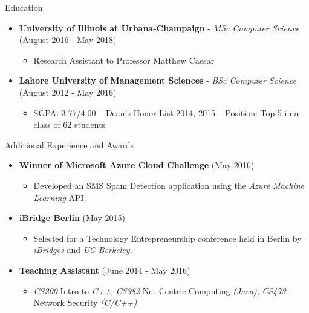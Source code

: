 \documentclass[]{Gohar_CV_Jobs}
\begin{document}
    \begin{cvsection}{Education}
        \begin{cvsubsection}{}{}{}
            \begin{itemize}
                \item \textbf{University of Illinois at Urbana-Champaign} - \textit{MSc Computer Science} \hfill(August 2016 - May 2018)
                    \begin{itemize}
                        \item Research Assistant to Professor Matthew Caesar 
                    \end{itemize}
                \item \textbf{Lahore University of Management Sciences} - \textit{BSc Computer Science} \hfill(August 2012 - May 2016)
                    \begin{itemize}
                        \item SGPA: 3.77/4.00 – Dean’s Honor List 2014, 2015 – Position: Top 5 in a class of 62 students
                    \end{itemize}
            \end{itemize}
        \end{cvsubsection}
    \end{cvsection}
    
    \begin{cvsection}{Additional Experience and Awards}
        \begin{cvsubsection}{}{}{}  
            \begin{itemize}
                \item \textbf{Winner of Microsoft Azure Cloud Challenge} \hfill(May 2016)
                    \begin{itemize}
                        \item Developed an SMS Spam Detection application using the \textit{Azure Machine Learning} API.
                    \end{itemize}
                \item \textbf{iBridge Berlin} \hfill(May 2015) 
                    \begin{itemize}
                        \item Selected for a Technology Entrepreneurship conference held in Berlin by \textit{iBridges} and \textit{UC Berkeley}.
                    \end{itemize}
                \item \textbf{Teaching Assistant} \hfill(June 2014 - May 2016) 
                    \begin{itemize}
                        \item \textit{CS200} Intro to \textit{C++}, \textit{CS382} Net-Centric Computing \textit{(Java)}, \textit{CS473} Network Security \textit{(C/C++)}
                    \end{itemize}
            \end{itemize}
        \end{cvsubsection}
    \end{cvsection}
\end{document}
